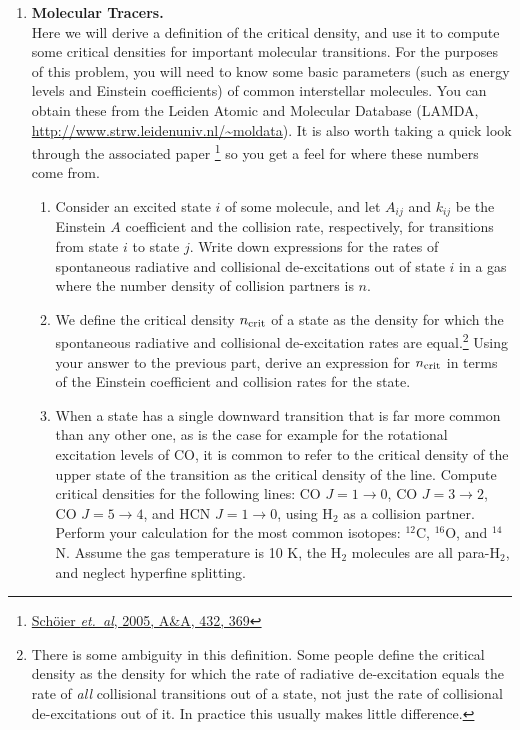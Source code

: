 \problemset

\begin{enumerate}

\item \textbf{Molecular Tracers.}\\
Here we will derive a definition of the critical density, and use it to compute some critical densities for important molecular transitions. For the purposes of this problem, you will need to know some basic parameters (such as energy levels and Einstein coefficients) of common interstellar molecules. You can obtain these from the Leiden Atomic and Molecular Database (LAMDA, \url{http://www.strw.leidenuniv.nl/~moldata}). It is also worth taking a quick look through the associated paper \citep{schoier05a}\footnote{\href{http://adsabs.harvard.edu/abs/2005A\%26A...432..369S}{Sch\"{o}ier {\it et.~al}, 2005, A\&A, 432, 369}} so you get a feel for where these numbers come from.
\begin{enumerate}
\item Consider an excited state $i$ of some molecule, and let $A_{ij}$ and $k_{ij}$ be the Einstein $A$ coefficient and the collision rate, respectively, for transitions from state $i$ to state $j$. Write down expressions for the rates of spontaneous radiative and collisional de-excitations out of state $i$ in a gas where the number density of collision partners is $n$.
\item We define the critical density $n_{\rm crit}$ of a state as the density for which the spontaneous radiative and collisional de-excitation rates are equal.\footnote{There is some ambiguity in this definition. Some people define the critical density as the density for which the rate of radiative de-excitation equals the rate of {\it all} collisional transitions out of a state, not just the rate of collisional de-excitations out of it. In practice this usually makes little difference.} Using your answer to the previous part, derive an expression for $n_{\rm crit}$ in terms of the Einstein coefficient and collision rates for the state. 
\item When a state has a single downward transition that is far more common than any other one, as is the case for example for the rotational excitation levels of CO, it is common to refer to the critical density of the upper state of the transition as the critical density of the line. Compute critical densities for the following lines: CO $J=1\rightarrow 0$, CO $J=3\rightarrow 2$, CO $J=5\rightarrow 4$, and HCN $J=1\rightarrow 0$, using H$_2$ as a collision partner. Perform your calculation for the most common isotopes: $^{12}$C, $^{16}$O, and $^{14}$N. Assume the gas temperature is 10 K, the H$_2$ molecules are all para-H$_2$, and neglect hyperfine splitting.

\end{enumerate}
\end{enumerate}
